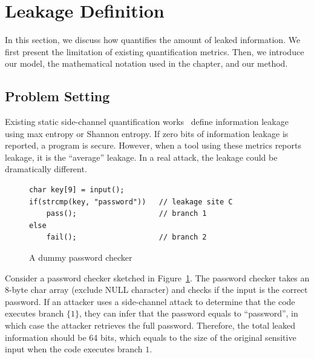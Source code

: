 \section{Leakage Definition}

In this section, we discuss how \tool{} quantifies the amount of leaked
information. We first present the limitation of existing quantification metrics.
Then, we introduce our model, the mathematical notation used in the
chapter, and our method.

\subsection{Problem Setting}
Existing static side-channel quantification
works~\cite{182946,Wichelmann:2018:MFF:3274694.3274741,zhang2010sidebuster,bang2016string} define information
leakage using max entropy or Shannon entropy.  If zero bits of
information leakage is reported, a program is secure. However, when a tool using these metrics reports leakage, it is the ``average'' leakage. In a real attack, the leakage could be dramatically different.

\begin{figure}[h!]
    \centering
    \begin{lstlisting}[xleftmargin=.1\textwidth, xrightmargin=.1\textwidth]
char key[9] = input();
if(strcmp(key, "password"))   // leakage site C
    pass();                   // branch 1
else
    fail();                   // branch 2
\end{lstlisting}
    \caption{A dummy password checker}
    \label{fig:password-checker}
\end{figure}

Consider a password checker sketched in Figure~\ref{fig:password-checker}.
The password checker takes an 8-byte char array (exclude \textsf{NULL} character)
and checks if the input is the correct password. If an attacker uses a side-channel attack to determine that the code executes branch
$\{{1\}}$, they can infer that the password equals to
``password'', in which case the attacker retrieves the full password.
Therefore, the total leaked information should be 64 bits, which equals to the
size of the original sensitive input when the code executes branch
$1$.

